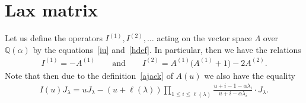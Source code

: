 \documentclass[11pt]{article}
\numberwithin{equation}{section}
\renewcommand\le{\leqslant}
\begin{document}
\section{Lax matrix}\label{Section6}

Let us def\/ine the operators $I^{(1)},I^{(2)},\ldots$ acting on the vector
space $\Lambda$ over $\mathbb Q(\alpha)$ by the equations~\eqref{iu} and~\eqref{hdef}.
In particular, then we have the relations
\begin{gather*}
I^{(1)}=-A^{(1)}
\qquad
\text{and}
\qquad
I^{(2)}=A^{(1)}\big(A^{(1)}
+1\big)-2A^{(2)}.
\end{gather*}
Note that then due to the def\/inition~\eqref{ajack} of $A(u)$ we also have the equality
\begin{gather*}
I(u)J_\lambda=uJ_\lambda-(u+\ell(\lambda))\prod_{1\le i
\le\ell(\lambda)}\frac{u+i-1-\alpha\lambda_i}{u+i-\alpha\lambda_i}\cdot J_\lambda.
\end{gather*}
\end{document}
